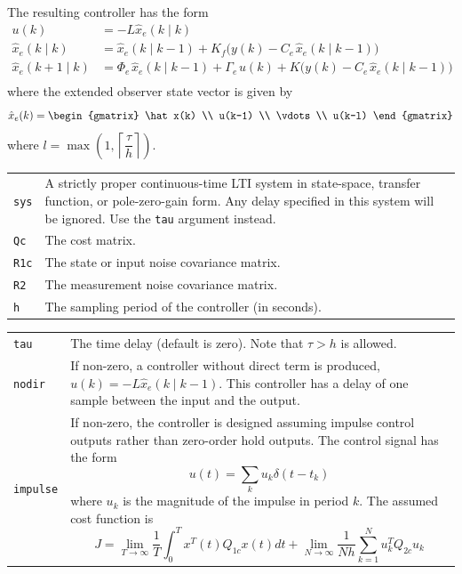 \documentclass[final,twoside]{rapport}  %
\begin{document}
The resulting controller has the form
\[
\begin{aligned}
u(k) &= -L \hat x_e(k \mid k) \\
\hat x_e(k\mid k) &= \hat x_e(k\mid k-1) + K_f \bigl( y(k) - C_{e\,} \hat x_e(k
\mid k-1) \bigr) \\
\hat x_e(k+1 \mid k) &= \Phi_{\!e\,} \hat x_e(k \mid k-1) + \Gamma_{\!e\,} u(k) + K
\bigl(y(k) - C_{e\,} \hat x_e(k\mid k-1)\bigr) \\
\end{aligned}
\]
where the extended observer state vector is given by
\[
\hat x_e(k) = \begin{gmatrix} \hat x(k) \\ u(k-1) \\ \vdots \\ u(k-l)
\end{gmatrix}
\]
where $l = \max\left(1, \left\lceil \dfrac{\tau}{h}
  \right\rceil\right)$. 

\args
\begin{tabularx}{\hsize}{l>{\raggedright\arraybackslash}X}
{\tt sys} & A strictly proper continuous-time LTI system in
state-space, transfer function, or pole-zero-gain form. Any delay
specified in this system will be ignored. Use the {\tt tau} argument
instead.\\
{\tt Qc} & The cost matrix.\\
{\tt R1c} & The state or input noise covariance matrix.\\
{\tt R2} & The measurement noise covariance matrix.\\
{\tt h} & The sampling period of the controller (in seconds).\\
\end{tabularx}

\optargs
\begin{tabularx}{\hsize}{l>{\raggedright\arraybackslash}X}
{\tt tau} & The time delay (default is zero). Note that $\tau>h$ is
allowed.\\
{\tt nodir} & If non-zero, a controller without direct
           term is produced, $u(k) = -L\hat x_e(k \mid k-1)$. This controller
           has a delay of one sample between the input and the output.\\
{\tt impulse} & If non-zero, the controller is designed assuming impulse control
outputs rather than zero-order hold outputs. The control signal has the form
\[
u(t) = \sum_{k} u_k \delta(t-t_k)
\]
where $u_k$ is the magnitude of the impulse in period $k$. The assumed cost function
is
\[
J = \lim_{T \rightarrow \infty} \frac{1}{T} \int_0^T
  x^T(t) Q_{1c} x(t)
     dt + \lim_{N\to\infty}\frac{1}{Nh} \sum_{k=1}^N u^T_k Q_{2c} u_k
\]
\end{tabularx}
\end{document}
